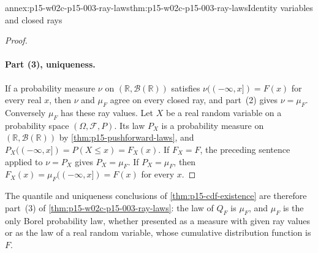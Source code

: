 \begin{annexitem}{annex:p15-w02c-p15-003-ray-laws}{thm:p15-w02c-p15-003-ray-laws}{Identity variables and closed rays}
\begin{proof}
\paragraph{Part (3), uniqueness.}
If a probability measure \(\nu\) on \((\mathbb R,\mathcal B(\mathbb R))\)
satisfies \(\nu((-\infty,x])=F(x)\) for every real \(x\), then \(\nu\)
and \(\mu_F\) agree on every closed ray, and part~(2) gives
\(\nu=\mu_F\). Conversely \(\mu_F\) has these ray values. Let \(X\) be a
real random variable on a probability space \((\Omega,\mathcal F,P)\).
Its law \(P_X\) is a probability measure on
\((\mathbb R,\mathcal B(\mathbb R))\) by \cref{thm:p15-pushforward-laws},
and \(P_X((-\infty,x])=P(X\leq x)=F_X(x)\). If \(F_X=F\), the preceding
sentence applied to \(\nu=P_X\) gives \(P_X=\mu_F\). If \(P_X=\mu_F\),
then \(F_X(x)=\mu_F((-\infty,x])=F(x)\) for every \(x\).
\end{proof}
\end{annexitem}

The quantile and uniqueness conclusions of \cref{thm:p15-cdf-existence}
are therefore part~(3) of \cref{thm:p15-w02c-p15-003-ray-laws}: the law of
\(Q_F\) is \(\mu_F\), and \(\mu_F\) is the only Borel probability law,
whether presented as a measure with given ray values or as the law of a
real random variable, whose cumulative distribution function is \(F\).


